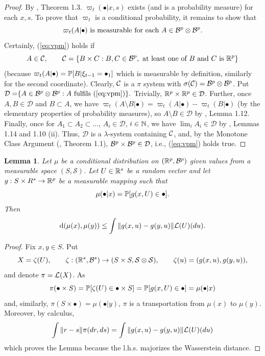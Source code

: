 \documentclass{article}              %
\newtheorem{lemma}{Lemma}
\begin{document}
\begin{proof}
By \cite{villani2003topics}, Theorem 1.3. $\varpi_{t}(\bullet|x,s)$
exists (and is a probability measure) for each $x,s$. To prove that
$\varpi_{t}$ is a conditional probability, it remains to show that
\begin{equation}
\text{\ensuremath{\varpi_{t}(A|\bullet)} is measurable for each \ensuremath{A\in\B^{p}\otimes\B^{p}.}}\label{eq:vpm}
\end{equation}
Certainly, (\ref{eq:vpm}) holds if $$A\in\C, \qquad \C=\{B\times C:B,C\in\B^{p},\text{ at least one of $B$ and $C$ is $\R^p$}\}$$
(because $\varpi_{t}(A|\bullet)=\P[B|\xi_{t-1}=\bullet_{1}]$ which
is measurable by definition, similarly for the second coordinate).
Clearly, $\C$ is a $\pi$ system with $\sigma(\C)=\B^{p}\otimes\B^{p}$.
Put $\mathcal{D=}\{A\in\B^{p}\otimes\B^{p}:A\text{ fulfils (\ref{eq:vpm})}\}.$
Trivially, $\R^{p}\times\R^{p}\in\mathcal{D}$. Further, once
$A,B\in\mathcal{D}$ and $B\subset A$, we have $\varpi_{t}(A\setminus B|\bullet)=\varpi_{t}(A|\bullet)-\varpi_{t}(B|\bullet)$
(by the elementary properties of probability measures), so $A\setminus B\in\mathcal{D}$
by \cite{Kallenberg02}, Lemma 1.12. Finally, once 
for $A_{1}\subset A_{2}\subset\dots$, $A_{i}\in\mathcal{D}$, $i\in \N$, we have $\lim_{i}A_{i}\in\mathcal{D}$
by \cite{Kallenberg02}, Lemmas 1.14 and 1.10 (ii). Thus, $\mathcal{D}$
is a $\lambda$-system containing $\C$, and, by the Monotone Class
Argument (\cite{Kallenberg02}, Theorem 1.1), $\B^{p}\times\B^{p}\in\mathcal{D}$,
i.e., (\ref{eq:vpm}) holds true.
\end{proof}
 
 
\begin{lemma}
\label{lem:flemma}Let $\mu$ be a conditional distribution on $(\R^{p},\B^{p})$ given values from a measurable
space $(S,\mathcal{S})$. Let $U\in\R^{s}$
be a random vector and let $g:S\times R^{s}\rightarrow\R^{p}$ be
a measurable mapping such that 
\begin{equation}
\mu(\bullet|x)=\P[g(x,U)\in\bullet].\label{eq:gut}
\end{equation}
Then
\[
\mathrm{d}(\mu(x),\mu(y))\leq\int\|g(x,u)-g(y,u)\|\L(U)(du).
\]
\end{lemma}

\begin{proof}
Fix $x,y\in S$. Put
\[
X=\zeta(U),\qquad 
\zeta:(\R^{s},\B^{s})\rightarrow(S\times S,\mathcal{S}\otimes\mathcal{S}),\qquad\zeta(u)=(g(x,u),g(y,u)),
\]
and denote $\pi=\L(X)$. As
\[
\pi(\bullet\times S)=\P[\zeta(U)\in\bullet\times S]=\P[g(x,U)\in\bullet]=\mu(\bullet|x)
\]
and, similarly, $\pi(S\times\bullet)=\mu(\bullet|y)$, $\pi$ is a
transportation from $\mu(x)$ to $\mu(y)$. Moreover, by calculus,
\[
\int\|r-s\|\pi(dr,ds)=\int\|g(x,u)-g(y,u)\|\L(U)(du)
\]
which proves the Lemma because the l.h.s. majorizes the Wasserstein
distance. 
\end{proof}
\end{document}
